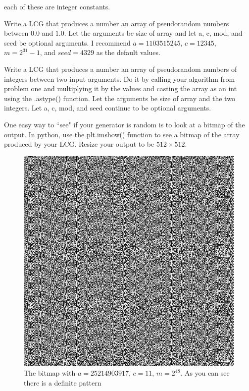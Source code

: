 each of these are integer constants.

\begin{problem}
Write a LCG that produces a number an array of pseudorandom numbers between $0.0$ and $1.0$.
Let the arguments be size of array and let a, c, mod, and seed be optional arguments.
I recommend $a=1103515245$, $c=12345$, $m=2^{31}-1$, and $seed=4329$ as the default values.
\end{problem}

\begin{problem}
Write a LCG that produces a number an array of pseudorandom numbers of integers between two input arguments.
Do it by calling your algorithm from problem one and multiplying it by the values and casting the array as an int using the .astype() function.
Let the arguments be size of array and the two integers.
Let a, c, mod, and seed continue to be optional arguments.
\end{problem}

One easy way to ``see" if your generator is random is to look at a bitmap of the output.
In python, use the plt.imshow() function to see a bitmap of the array produced by your LCG.
Resize your output to be $512 \times 512$. 

\begin{figure}[H]
\includegraphics[scale = .4]{PRNG1.jpg}
\caption{The bitmap with $a=25214903917$, $c=11$, $m=2^{48}$. As you can see there is a definite pattern}
\end{figure}

